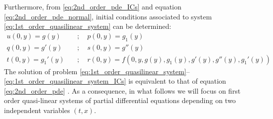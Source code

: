Furthermore, from \eqref{eq:2nd_order_pde_ICs} and equation \eqref{eq:2nd_order_pde_normal}, initial conditions associated to system \eqref{eq:1st_order_quasilinear_system} can be determined:
\begin{equation}
  \label{eq:1st_order_quasilinear_system_ICs}
  \begin{aligned}
    u(0,y) = g(y) \quad & ; \quad     p(0,y) = g_1(y) \\
    q(0,y) = g'(y) \quad & ; \quad    s(0,y) = g''(y) \\
    t(0,y) = g_1'(y) \quad & ; \quad    r(0,y) = f(0,y,g(y),g_1(y),g'(y),g''(y),g_1'(y))
  \end{aligned}
\end{equation}
The solution of problem \eqref{eq:1st_order_quasilinear_system}--\eqref{eq:1st_order_quasilinear_system_ICs}  is equivalent to that of equation \eqref{eq:2nd_order_pde} \cite{Courant}.
As a consequence, in what follows we will focus on first order quasi-linear systems of partial differential equations depending on two independent variables $(t,x)$.
